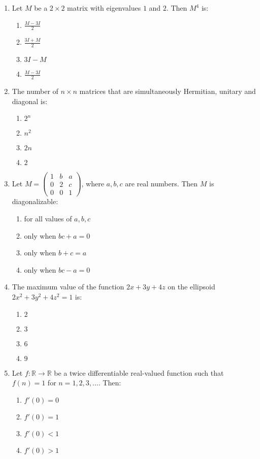 \documentclass[journal,12pt,onecolumn]{IEEEtran}
\theoremstyle{remark}
\begin{document}
\begin{enumerate}
\item Let $M$ be a $2 \times 2$ matrix with eigenvalues $1$ and $2$. Then $M^4$ is:
\begin{enumerate}
    \item $\frac{M - 3I}{2}$
    \item $\frac{3I + M}{2}$
    \item $3I - M$
    \item $\frac{M - 3I}{2}$
\end{enumerate}
\item The number of $n \times n$ matrices that are simultaneously Hermitian, unitary and diagonal is:
\begin{enumerate}
    \item $2^n$
    \item $n^2$
    \item $2n$
    \item $2$
\end{enumerate}

\item Let $M = \begin{pmatrix} 1 & b & a \\ 0 & 2 & c \\ 0 & 0 & 1 \end{pmatrix}$, where $a, b, c$ are real numbers. Then $M$ is diagonalizable:
\begin{enumerate}
    \item for all values of $a, b, c$
    \item only when $bc + a = 0$
    \item only when $b + c = a$
    \item only when $bc - a = 0$
\end{enumerate}

\item The maximum value of the function $2x + 3y + 4z$ on the ellipsoid $2x^2 + 3y^2 + 4z^2 = 1$ is:
\begin{enumerate}
    \item $2$
    \item $3$
    \item $6$
    \item $9$
\end{enumerate}

\item Let $f: \mathbb{R} \to \mathbb{R}$ be a twice differentiable real-valued function such that $f(n) = 1$ for $n = 1, 2, 3, \dots$. Then:
\begin{enumerate}
    \item $f'(0) = 0$
    \item $f'(0) = 1$
    \item $f'(0) < 1$
    \item $f'(0) > 1$
\end{enumerate}


\end{enumerate}
\end{document}
